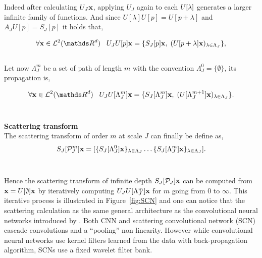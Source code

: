 \documentclass[a4paper,11pt]{report}
\begin{document}
			Indeed after calculating $U_{J}{\bf x}$, applying $U_{J}$ again to each $U[\lambda]\bf$ generates a larger infinite family of functions. And since $U[\lambda]U[p] = U[p+\lambda]$ and $ A_{J}U[p] = S_{J}[p]$ it holds that,
			
			\begin{equation}
					\forall \bfx \in \mcalL^{2}(\dsR^{d}) \;\;\; U_{J}U[p] \bfx = \{ S_{J}[p]\bfx , \; (U[p+\lambda]\bfx)_{\lambda \in \Lambda_{J}} \},
					\label{eq:SCN propagation 1}
			\end{equation}\\
			
			Let now $\Lambda_{J}^{m}$ be a set of path of length $m$ with the convention $\Lambda_{J}^{0} = \{ \emptyset \}$, its propagation is,
			
			\begin{equation}
					\forall \bfx \in \mcalL^{2}(\dsR^{d}) \;\;\; U_{J}U[\Lambda_{J}^{m}] \bfx = \{ S_{J}[\Lambda_{J}^{m}]\bfx , \; (U[\Lambda_{J}^{m+1}]\bfx)_{\lambda \in \Lambda_{J}} \}.
					\label{eq:SCN propagation 2}
			\end{equation}\\
			
			\begin{defn}  \textbf{Scattering transform}\\			  
			  The scattering transform of order $m$ at scale $J$ can finally be define as,
			  \begin{equation}
			    S_{J}[\mathcal{P}_{J}^{m}]{\bf x} = [\{S_{J}[\Lambda_{J}^{0}]{\bf x}\}_{\lambda \in \Lambda_{J}} \dots \{S_{J}[\Lambda_{J}^{m}]{\bf x}\}_{\lambda \in \Lambda_{J}}].\\
					\label{eq:scattering transform}
			  \end{equation}\\ 
			\end{defn}
			
			Hence the scattering transform of infinite depth $S_{J}[\mathcal{P}_{J}]{\bf x}$ can be computed from ${\bf x}= U[\emptyset]{\bf x}$ by iteratively computing $U_{J}U[\Lambda_{J}^{m}] {\bf x}$ for $m$ going from $0$ to $\infty$. This iterative process is illustrated in Figure~\ref{fig:SCN} and one can notice that the scattering calculation as the same general architecture as the convolutional neural networks introduced by \cite{lecun1995convolutional}. Both CNN and scattering convolutional network (SCN) cascade convolutions and a ``pooling'' non linearity. However while convolutional neural networks use kernel filters learned from the data with back-propagation algorithm, SCNs use a fixed wavelet filter bank. 
\end{document}
